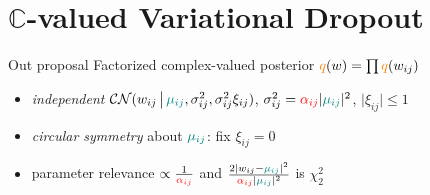 \documentclass{beamer}
\newcommand{\cplx}{\mathbb{C}}
\begin{document}


\section{$\cplx$-valued Variational Dropout} %
\label{sec:extension_to_complex_parameters}

\begin{frame}[c]{\insertsection}{Out proposal}
  \medskip
  Factorized complex-valued posterior $
    {\color{orange} q}(w) = \prod {\color{orange} q}(w_{ij})
  $
  \begin{itemize}
    \item \emph{independent} $
      \mathcal{CN}(
        w_{ij}\,\big\vert\,
        {\color{teal} \mu_{ij}},
        \sigma_{ij}^2,
        \sigma_{ij}^2 \xi_{ij}
      )
    $, $
      \sigma_{ij}^2
        = {\color{red} \alpha_{ij}} \lvert {\color{teal} \mu_{ij}} \rvert^2
    $, $\lvert \xi_{ij} \rvert \leq 1$

    \pause
    \medskip
    \item \emph{circular symmetry} about ${\color{teal} \mu_{ij}}$: fix $
      \xi_{ij} = 0
    $


    \pause
    \medskip
    \item parameter relevance $
      \propto \frac1{{\color{red} \alpha_{ij}}}
    $ and $
      \tfrac{2 \lvert w_{ij} - {\color{teal} \mu_{ij}} \rvert^2}
            {{\color{red} \alpha_{ij}} \lvert {\color{teal} \mu_{ij}} \rvert^2}
    $ is $\chi^2_2$
  \end{itemize}

  \bigskip


\end{frame}
\end{document}
